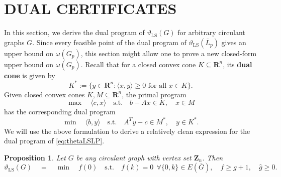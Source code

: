 \documentclass[]{spie}  %
\newtheorem{prop}[thm]{Proposition}
\begin{document}
\section{DUAL CERTIFICATES}

In this section, we derive the dual program of $\vartheta_{\operatorname{LS}}(G)$ for arbitrary circulant graphs $G$.
Since every feasible point of the dual program of $\vartheta_{\operatorname{LS}}(\overline{L}_p)$ gives an upper bound on $\omega(G_p)$, this section might allow one to prove a new closed-form upper bound on $\omega(G_p)$.
Recall that for a closed convex cone $K \subseteq \mathbf{R}^n$, its \textbf{dual cone} is given by
\[
K^* := \{y \in \mathbf{R}^n : \langle x,y \rangle \geq 0 \text{ for all } x \in K\}.
\]
Given closed convex cones $K,M \subseteq \mathbf{R}^n$, the primal program
\begin{equation}
\label{eq:standardPrimal}
\operatorname{max}
\quad
\langle c,x \rangle
\quad
\text{s.t.}
\quad
b - Ax \in K,
\quad
x \in M
\end{equation}
has the corresponding dual program
\[
\operatorname{min}
\quad
\langle b,y \rangle
\quad
\text{s.t.}
\quad
A^Ty - c \in M^*,
\quad
y \in K^*.
\]
We will use the above formulation to derive a relatively clean expression for the dual program of \eqref{eq:thetaLSLP}.

\begin{prop}\label{prop: thetaLS dual}
Let $G$ be any circulant graph with vertex set $\mathbf{Z}_n$. Then
\[
\vartheta_{\operatorname{LS}}(G)
\quad
=
\quad
\operatorname{min}
\quad
f(0)
\quad
\text{s.t.} 
\quad
f(k) = 0~~\forall\{0,k\}\in E(\overline{G}),
\quad
f \geq g + 1,
\quad
\widehat{g} \geq 0.
\]
\end{prop}
\end{document}
